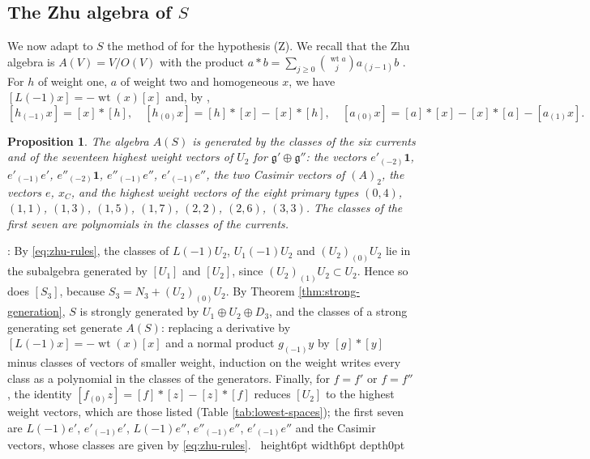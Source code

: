 \documentclass[leqno]{article}
\renewcommand{\geq}{\ensuremath{\geqslant}}
\newcommand{\qed}{\hfill \vrule height6pt  width6pt depth0pt}
\newtheorem{prop}[thm]{Proposition}
\newenvironment{proof}[1][]{\noindent {\it Proof #1} : }{\hbox{~}\qed
\smallskip
}
\numberwithin{equation}{section}
\begin{document}
\subsection{The Zhu algebra of \texorpdfstring{$S$}{S}}
\label{subsec:zhu}

We now adapt to $S$ the method of \cite[Part III]{Rie26b} for the hypothesis (Z). We recall that the Zhu algebra is $A(V) = V/O(V)$ with the product $a * b = \sum_{j \geq 0}\binom{\operatorname{wt}a}{j}a_{(j-1)}b$ \cite[Definition 2.1.2 and Theorem 2.1.1]{Zhu96}. For $h$ of weight one, $a$ of weight two and homogeneous $x$, we have $[L(-1)x] = -\operatorname{wt}(x)[x]$ \cite[Lemma 2.1.1]{Zhu96} and, by \cite[Lemma 2.1.3]{Zhu96},
\begin{equation}
\label{eq:zhu-rules}
[h_{(-1)}x] = [x]*[h], \quad [h_{(0)}x] = [h]*[x] - [x]*[h], \quad [a_{(0)}x] = [a]*[x] - [x]*[a] - [a_{(1)}x].
\end{equation}

\begin{prop}
\label{prop:zhu-generators}
The algebra $A(S)$ is generated by the classes of the six currents and of the seventeen highest weight vectors of $U_2$ for $\mathfrak g' \oplus \mathfrak g''$: the vectors $e'_{(-2)}\mathbf 1$, $e'_{(-1)}e'$, $e''_{(-2)}\mathbf 1$, $e''_{(-1)}e''$, $e'_{(-1)}e''$, the two Casimir vectors of $(A)_2$, the vectors $e$, $x_C$, and the highest weight vectors of the eight primary types $(0,4)$, $(1,1)$, $(1,3)$, $(1,5)$, $(1,7)$, $(2,2)$, $(2,6)$, $(3,3)$. The classes of the first seven are polynomials in the classes of the currents.
\end{prop}

\begin{proof}
By \eqref{eq:zhu-rules}, the classes of $L(-1)U_2$, $U_1(-1)U_2$ and $(U_2)_{(0)}U_2$ lie in the subalgebra generated by $[U_1]$ and $[U_2]$, since $(U_2)_{(1)}U_2 \subset U_2$. Hence so does $[S_3]$, because $S_3 = N_3 + (U_2)_{(0)}U_2$. By Theorem \ref{thm:strong-generation}, $S$ is strongly generated by $U_1 \oplus U_2 \oplus D_3$, and the classes of a strong generating set generate $A(S)$: replacing a derivative by $[L(-1)x] = -\operatorname{wt}(x)[x]$ and a normal product $g_{(-1)}y$ by $[g]*[y]$ minus classes of vectors of smaller weight, induction on the weight writes every class as a polynomial in the classes of the generators. Finally, for $f = f'$ or $f = f''$, the identity $[f_{(0)}z] = [f]*[z] - [z]*[f]$ reduces $[U_2]$ to the highest weight vectors, which are those listed (Table \ref{tab:lowest-spaces}); the first seven are $L(-1)e'$, $e'_{(-1)}e'$, $L(-1)e''$, $e''_{(-1)}e''$, $e'_{(-1)}e''$ and the Casimir vectors, whose classes are given by \eqref{eq:zhu-rules}.
\end{proof}
\end{document}
